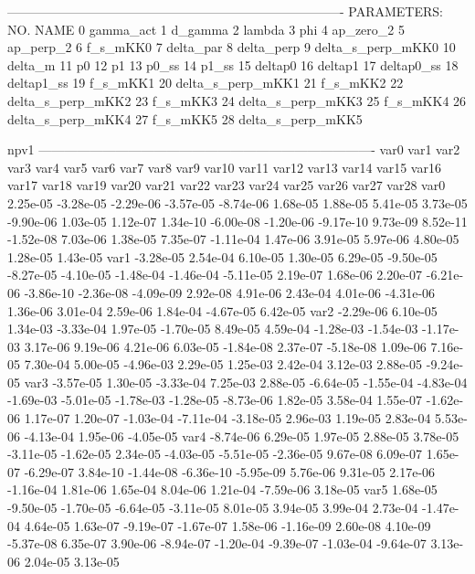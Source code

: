-------------------------------------------------------------------------------
 PARAMETERS:
    NO.   NAME      
     0 gamma_act    
     1 d_gamma      
     2 lambda      
     3 phi         
     4 ap_zero_2   
     5 ap_perp_2   
     6 f_s_mKK0    
     7 delta_par  
     8 delta_perp 
     9 delta_s_perp_mKK0 
    10 delta_m      
    11 p0          
    12 p1          
    13 p0_ss       
    14 p1_ss       
    15 deltap0    
    16 deltap1    
    17 deltap0_ss 
    18 deltap1_ss 
    19 f_s_mKK1   
    20 delta_s_perp_mKK1 
    21 f_s_mKK2    
    22 delta_s_perp_mKK2 
    23 f_s_mKK3    
    24 delta_s_perp_mKK3 
    25 f_s_mKK4    
    26 delta_s_perp_mKK4 
    27 f_s_mKK5    
    28 delta_s_perp_mKK5 


npv1
-------------------------------------------------------------------------------
var0 var1 var2 var3 var4 var5 var6 var7 var8 var9 var10 var11 var12 var13 var14 var15 var16 var17 var18 var19 var20 var21 var22 var23 var24 var25 var26 var27 var28 
var0  2.25e-05 -3.28e-05 -2.29e-06 -3.57e-05 -8.74e-06  1.68e-05  1.88e-05  5.41e-05  3.73e-05 -9.90e-06  1.03e-05  1.12e-07  1.34e-10 -6.00e-08 -1.20e-06 -9.17e-10  9.73e-09  8.52e-11 -1.52e-08  7.03e-06  1.38e-05  7.35e-07 -1.11e-04  1.47e-06  3.91e-05  5.97e-06  4.80e-05  1.28e-05  1.43e-05
var1 -3.28e-05  2.54e-04  6.10e-05  1.30e-05  6.29e-05 -9.50e-05 -8.27e-05 -4.10e-05 -1.48e-04 -1.46e-04 -5.11e-05  2.19e-07  1.68e-06  2.20e-07 -6.21e-06 -3.86e-10 -2.36e-08 -4.09e-09  2.92e-08  4.91e-06  2.43e-04  4.01e-06 -4.31e-06  1.36e-06  3.01e-04  2.59e-06  1.84e-04 -4.67e-05  6.42e-05
var2 -2.29e-06  6.10e-05  1.34e-03 -3.33e-04  1.97e-05 -1.70e-05  8.49e-05  4.59e-04 -1.28e-03 -1.54e-03 -1.17e-03  3.17e-06  9.19e-06  4.21e-06  6.03e-05 -1.84e-08  2.37e-07 -5.18e-08  1.09e-06  7.16e-05  7.30e-04  5.00e-05 -4.96e-03  2.29e-05  1.25e-03  2.42e-04  3.12e-03  2.88e-05 -9.24e-05
var3 -3.57e-05  1.30e-05 -3.33e-04  7.25e-03  2.88e-05 -6.64e-05 -1.55e-04 -4.83e-04 -1.69e-03 -5.01e-05 -1.78e-03 -1.28e-05 -8.73e-06  1.82e-05  3.58e-04  1.55e-07 -1.62e-06  1.17e-07  1.20e-07 -1.03e-04 -7.11e-04 -3.18e-05  2.96e-03  1.19e-05  2.83e-04  5.53e-06 -4.13e-04  1.95e-06 -4.05e-05
var4 -8.74e-06  6.29e-05  1.97e-05  2.88e-05  3.78e-05 -3.11e-05 -1.62e-05  2.34e-05 -4.03e-05 -5.51e-05 -2.36e-05  9.67e-08  6.09e-07  1.65e-07 -6.29e-07  3.84e-10 -1.44e-08 -6.36e-10 -5.95e-09  5.76e-06  9.31e-05  2.17e-06 -1.16e-04  1.81e-06  1.65e-04  8.04e-06  1.21e-04 -7.59e-06  3.18e-05
var5  1.68e-05 -9.50e-05 -1.70e-05 -6.64e-05 -3.11e-05  8.01e-05  3.94e-05  3.99e-04  2.73e-04 -1.47e-04  4.64e-05  1.63e-07 -9.19e-07 -1.67e-07  1.58e-06 -1.16e-09  2.60e-08  4.10e-09 -5.37e-08  6.35e-07  3.90e-06 -8.94e-07 -1.20e-04 -9.39e-07 -1.03e-04 -9.64e-07  3.13e-06  2.04e-05  3.13e-05
